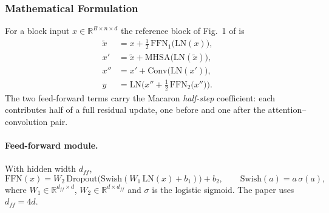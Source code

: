 \subsubsection{Mathematical Formulation}

For a block input $x \in \mathbb{R}^{B \times n \times d}$ the reference block of Fig.~1 of \citet{Gulati2020} is
\begin{align}
\tilde{x} &= x + \tfrac{1}{2}\,\mathrm{FFN}_1\big(\mathrm{LN}(x)\big), \label{eq:conformer-ffn1}\\
x' &= \tilde{x} + \mathrm{MHSA}\big(\mathrm{LN}(\tilde{x})\big), \label{eq:conformer-mhsa}\\
x'' &= x' + \mathrm{Conv}\big(\mathrm{LN}(x')\big), \label{eq:conformer-conv}\\
y &= \mathrm{LN}\Big(x'' + \tfrac{1}{2}\,\mathrm{FFN}_2\big(x''\big)\Big). \label{eq:conformer-ffn2}
\end{align}
The two feed-forward terms carry the Macaron \emph{half-step} coefficient: each contributes half of a full residual update, one before and one after the attention--convolution pair.

\paragraph{Feed-forward module.} With hidden width $d_{ff}$,
\begin{equation}
\mathrm{FFN}(x) = W_2\,\mathrm{Dropout}\big(\mathrm{Swish}(W_1\,\mathrm{LN}(x) + b_1)\big) + b_2,
\qquad
\mathrm{Swish}(a) = a\,\sigma(a),
\label{eq:conformer-ffn}
\end{equation}
where $W_1 \in \mathbb{R}^{d_{ff} \times d}$, $W_2 \in \mathbb{R}^{d \times d_{ff}}$ and $\sigma$ is the logistic sigmoid. The paper uses $d_{ff} = 4d$.

